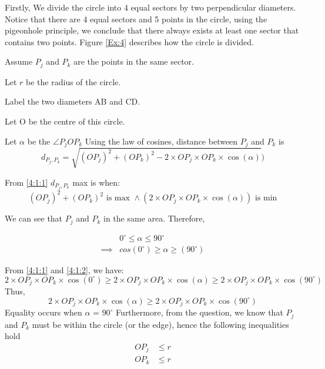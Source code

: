 \documentclass{article}
\renewcommand{\a}{\land}
\begin{document}
\begin{enumerate}[label=({\alph*})]
	Firstly, We divide the circle into 4 equal sectors by two perpendicular diameters. Notice that there are 4 equal sectors and 5 points in the circle, using the pigeonhole principle, we conclude that there always exists at least one sector that contains two points. Figure \ref{Ex:4} describes how the circle is divided.

	Assume \({P_j}\) and \({P_k}\) are the points in the same sector.

	Let \(r\) be the radius of the circle.

	Label the two diameters AB and CD.

	Let O be the centre of this circle. 

	Let \(\alpha\) be the \(\angle{P_jOP_k}\)
	\pagebreak
	Using the law of cosines, distance between \({P_j}\) and \({P_k}\) is
	\begin{equation}
		d_{P_j,P_k} = \sqrt{(O{P_j})^2 + (O{P_k})^2 - 2 \times O{P_j} \times O{P_k}\times \cos(\alpha)}) \label{4:1:1}
	\end{equation}
	

	From \eqref{4:1:1} $d_{P_j,P_k}$  max is when:
	$$(O{P_j})^2 + (O{P_k})^2 \text{ is max } \a  (2 \times O{P_j} \times O{P_k}\times \cos(\alpha)) \text{ is min}$$ 
	
	We can see that \({P_j}\) and \({P_k}\) in the same area. Therefore,

	\begin{align}
		&0^\circ \leq \alpha \leq 90^\circ \nonumber\\
		\implies &cos(0^\circ) \geq \alpha \geq (90^\circ) \label{4:1:2}	
	\end{align}

	From \eqref{4:1:1} and \eqref{4:1:2}, we have:
	\begin{equation}
		2 \times O{P_j} \times O{P_k}\times \cos(0^\circ) \geq 2 \times O{P_j} \times O{P_k}\times \cos(\alpha) \geq 2 \times O{P_j} \times O{P_k}\times \cos(90^\circ)
	\end{equation}
	Thus,  
	\[2 \times O{P_j} \times O{P_k}\times \cos(\alpha) \geq 2 \times O{P_j} \times O{P_k}\times \cos(90^\circ)\]
	Equality occurs when \(\alpha\) = $90^\circ$
	Furthermore, from the question, we know that \(P_j\) and \(P_k\) must be within the circle (or the edge), hence the following inequalities hold
	\begin{align}
		OP_j &\leq r \label{4:1:3}\\ 
		OP_k &\leq r \label{4:1:4}
	\end{align}


\end{enumerate}
\end{document}
